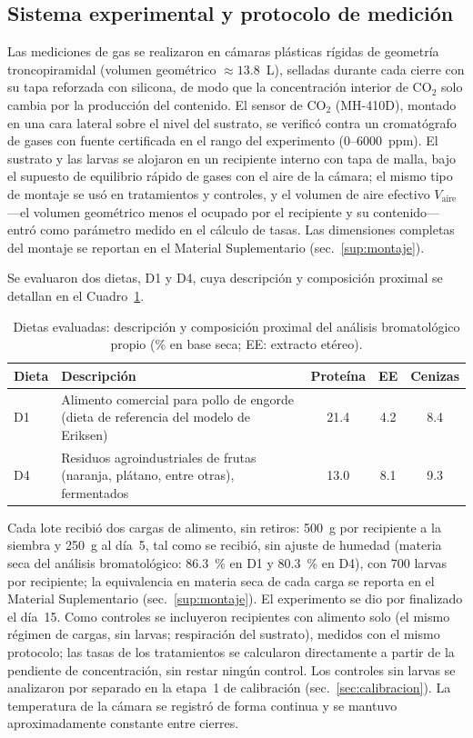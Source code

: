 \subsection{Sistema experimental y protocolo de medición}
\label{sec:sistema}

Las mediciones de gas se realizaron en cámaras plásticas rígidas de geometría troncopiramidal (volumen geométrico $\approx 13.8$~L), selladas durante cada cierre con su tapa reforzada con silicona, de modo que la concentración interior de CO$_2$ solo cambia por la producción del contenido. El sensor de CO$_2$ (MH-410D), montado en una cara lateral sobre el nivel del sustrato, se verificó contra un cromatógrafo de gases con fuente certificada en el rango del experimento (0--6000~ppm). El sustrato y las larvas se alojaron en un recipiente interno con tapa de malla, bajo el supuesto de equilibrio rápido de gases con el aire de la cámara; el mismo tipo de montaje se usó en tratamientos y controles, y el volumen de aire efectivo $V_{\mathrm{aire}}$ ---el volumen geométrico menos el ocupado por el recipiente y su contenido--- entró como parámetro medido en el cálculo de tasas. Las dimensiones completas del montaje se reportan en el Material Suplementario (sec.~\ref{sup:montaje}).

Se evaluaron dos dietas, D1 y D4, cuya descripción y composición proximal se
detallan en el Cuadro~\ref{tab:dietas}.

\begin{table}[htbp]
  \centering
  \caption{Dietas evaluadas: descripción y composición proximal del análisis
  bromatológico propio (\% en base seca; EE: extracto etéreo).}
  \label{tab:dietas}
  \begin{tabular}{lp{5.4cm}ccc}
    \hline
    Dieta & Descripción & Proteína & EE & Cenizas \\
    \hline
    D1 & Alimento comercial para pollo de engorde (dieta de referencia del
         modelo de Eriksen) & 21.4 & 4.2 & 8.4 \\
    D4 & Residuos agroindustriales de frutas (naranja, plátano, entre
         otras), fermentados & 13.0 & 8.1 & 9.3 \\
    \hline
  \end{tabular}
\end{table}

Cada lote recibió dos cargas de alimento, sin retiros: 500~g por recipiente a la siembra y 250~g al día~5, tal como se recibió, sin ajuste de humedad (materia seca del análisis bromatológico: 86.3~\% en D1 y 80.3~\% en D4), con 700 larvas por recipiente; la equivalencia en materia seca de cada carga se reporta en el Material Suplementario (sec.~\ref{sup:montaje}). El experimento se dio por finalizado el día~15. Como controles se incluyeron recipientes con alimento solo (el mismo régimen de cargas, sin larvas; respiración del sustrato), medidos con el mismo protocolo; las tasas de los tratamientos se calcularon directamente a partir de la pendiente de concentración, sin restar ningún control. Los controles sin larvas se analizaron por separado en la etapa~1 de calibración (sec.~\ref{sec:calibracion}). La temperatura de la cámara se registró de forma continua y se mantuvo aproximadamente constante entre cierres.

